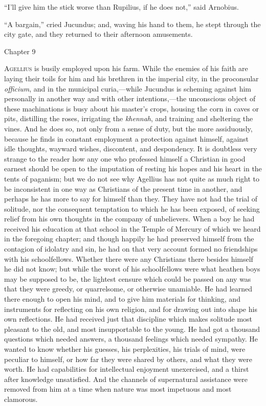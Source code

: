``I'll give him the stick worse than Rupilius, if he does
not,'' said Arnobius.

``A bargain,'' cried Jucundus; and, waving his hand to
them, he stept through the city gate, and they returned to their
afternoon amusements.

Chapter 9


A\textsc{gellius} is busily employed upon his farm. While the enemies
of his faith are laying their toils for him and his brethren in the
imperial city, in the proconsular \emph{officium}, and in the
municipal curia,—while Jucundus is scheming against him personally
in another way and with other intentions,—the unconscious object of
these machinations is busy about his master's crops, housing the corn
in caves or pits, distilling the roses, irrigating the \emph{khennah},
and training and sheltering the vines. And he does so, not only from a
sense of duty, but the more assiduously, because he finds in constant
employment a protection against himself, against idle thoughts,
wayward wishes, discontent, and despondency. It is doubtless very
strange to the reader how any one who professed himself a Christian in
good earnest should be open to the imputation of resting his hopes and
his heart in the tents of paganism; but we do not see why Agellius has
not quite as much right to be inconsistent in one way as Christians of
the present time in another, and perhaps he has more to say for
himself than they. They have not had the trial of solitude, nor
the consequent temptation to which he has been exposed, of seeking
relief from his own thoughts in the company of unbelievers. When a boy
he had received his education at that school in the Temple of Mercury
of which we heard in the foregoing chapter; and though happily he had
preserved himself from the contagion of idolatry and sin, he had on
that very account formed no friendships with his schoolfellows.
Whether there were any Christians there besides himself he did not
know; but while the worst of his schoolfellows were what heathen boys
may be supposed to be, the lightest censure which could be passed on
any was that they were greedy, or quarrelsome, or otherwise unamiable.
He had learned there enough to open his mind, and to give him
materials for thinking, and instruments for reflecting on his own
religion, and for drawing out into shape his own reflections. He had
received just that discipline which makes solitude most pleasant to
the old, and most insupportable to the young. He had got a thousand
questions which needed answers, a thousand feelings which needed
sympathy. He wanted to know whether his guesses, his perplexities, his
trials of mind, were peculiar to himself, or how far they were shared
by others, and what they were worth. He had capabilities for
intellectual enjoyment unexercised, and a thirst after knowledge
unsatisfied. And the channels of supernatural assistance were removed
from him at a time when nature was most impetuous and most clamorous.

